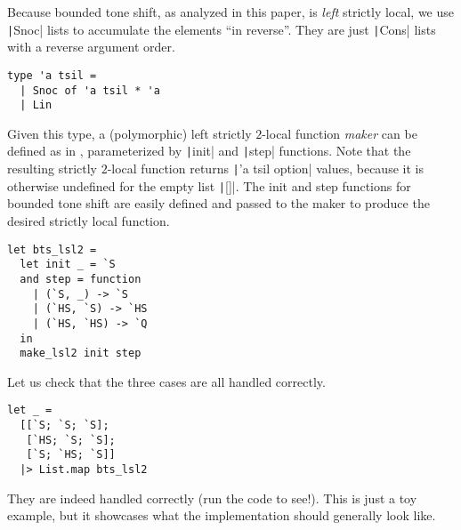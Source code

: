 \documentclass[11pt]{article}
\theoremstyle{definition}
\theoremstyle{plain}
\begin{document}
Because bounded tone shift, as analyzed in this paper, is \emph{left}
strictly local, we use \texttt|Snoc| lists to accumulate
the elements \enquote{in reverse}.  They are just
\texttt|Cons| lists with a reverse argument order.
%
\begin{verbatim}
type 'a tsil =
  | Snoc of 'a tsil * 'a
  | Lin
\end{verbatim}
%
Given this type, a (polymorphic) left strictly \(2\)-local function
\emph{maker} can be defined as in , parameterized
by \texttt|init| and \texttt|step| functions.
Note that the resulting strictly \(2\)-local function returns
\texttt|'a tsil option| values, because it is otherwise
undefined for the empty list \texttt|[]|.  The init and
step functions for bounded tone shift are easily defined and passed to
the maker to produce the desired strictly local function.
%
\begin{verbatim}
let bts_lsl2 =
  let init _ = `S
  and step = function
    | (`S, _) -> `S
    | (`HS, `S) -> `HS
    | (`HS, `HS) -> `Q
  in
  make_lsl2 init step
\end{verbatim}
%
Let us check that the three cases are all handled correctly.
%
\begin{verbatim}
let _ =
  [[`S; `S; `S];
   [`HS; `S; `S];
   [`S; `HS; `S]]
  |> List.map bts_lsl2
\end{verbatim}
%
They are indeed handled correctly (run the code to see!).  This is
just a toy example, but it showcases what the implementation should
generally look like.



\end{document}
